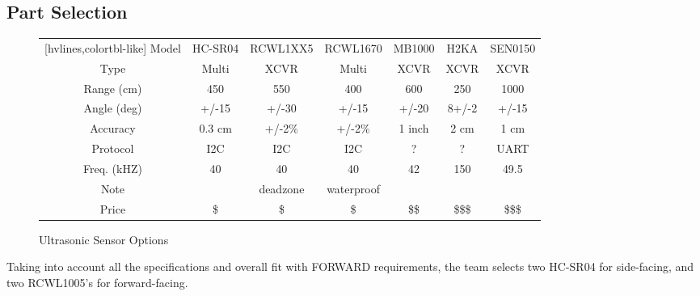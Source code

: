 \subsection{Part Selection}

\begin{figure}[H]
	\centering
	\setlength{\tabcolsep}{5pt} %
	\renewcommand{\arraystretch}{1.5} %
	\begin{NiceTabular}{ccccccc}[hvlines,colortbl-like]
		\CodeBefore
		\Body
		Model       & HC-SR04 & RCWL1XX5 & RCWL1670   & MB1000 & H2KA  & SEN0150 \\
		Type        & Multi   & XCVR     & Multi      & XCVR   & XCVR  & XCVR    \\
		Range (cm)  & 450     & 550      & 400        & 600    & 250   & 1000    \\
		Angle (deg) & +/-15   & +/-30    & +/-15      & +/-20  & 8+/-2 & +/-15   \\
		Accuracy    & 0.3 cm  & +/-2\%   & +/-2\%     & 1 inch & 2 cm  & 1 cm    \\
		Protocol    & I2C     & I2C      & I2C        & ?      & ?     & UART    \\
		Freq. (kHZ) & 40      & 40       & 40         & 42     & 150   & 49.5    \\
		Note        &         & deadzone & waterproof &        &       &         \\
		Price       & \$      & \$       & \$         & \$\$   & \$\$\$& \$\$\$
	\end{NiceTabular}
	\caption{\label{fig:compareUltrasonic}Ultrasonic Sensor Options}
\end{figure}

\noindent Taking into account all the specifications and overall fit with FORWARD requirements, the team selects two HC-SR04 for side-facing, and two RCWL1005's for forward-facing.\\

